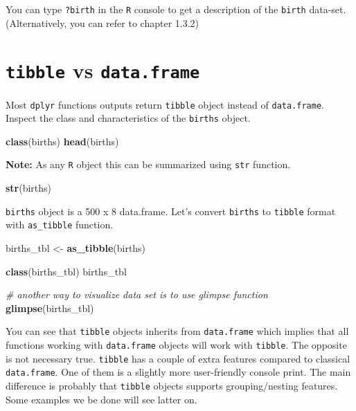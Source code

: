 \documentclass[
]{book}
\newenvironment{Shaded}{\begin{snugshade}}{\end{snugshade}}
\newcommand{\CommentTok}[1]{\textcolor[rgb]{0.56,0.35,0.01}{\textit{#1}}}
\newcommand{\FunctionTok}[1]{\textcolor[rgb]{0.13,0.29,0.53}{\textbf{#1}}}
\newcommand{\NormalTok}[1]{#1}
\newcommand{\OtherTok}[1]{\textcolor[rgb]{0.56,0.35,0.01}{#1}}
\begin{document}
You can type \texttt{?birth} in the \texttt{R} console to get a description of the \texttt{birth} data-set. (Alternatively, you can refer to chapter 1.3.2)

\section{\texorpdfstring{\texttt{tibble} vs \texttt{data.frame}}{tibble vs data.frame}}\label{tibble-vs-data.frame}

Most \texttt{dplyr} functions outputs return \texttt{tibble} object instead of
\texttt{data.frame}.
Inspect the class and characteristics of the \texttt{births} object.

\begin{Shaded}
\begin{Highlighting}[]
\FunctionTok{class}\NormalTok{(births)}
\FunctionTok{head}\NormalTok{(births)}
\end{Highlighting}
\end{Shaded}

\textbf{Note:} As any \texttt{R} object this can be summarized using \texttt{str} function.

\begin{Shaded}
\begin{Highlighting}[]
\FunctionTok{str}\NormalTok{(births)}
\end{Highlighting}
\end{Shaded}

\texttt{births} object is a 500 x 8 data.frame.
Let's convert \texttt{births} to \texttt{tibble} format with \texttt{as\_tibble} function.

\begin{Shaded}
\begin{Highlighting}[]
\NormalTok{births\_tbl }\OtherTok{\textless{}{-}} \FunctionTok{as\_tibble}\NormalTok{(births)}

\FunctionTok{class}\NormalTok{(births\_tbl)}
\NormalTok{births\_tbl}

\CommentTok{\# another way to visualize data set is to use glimpse function}
\FunctionTok{glimpse}\NormalTok{(births\_tbl)}
\end{Highlighting}
\end{Shaded}

You can see that \texttt{tibble} objects inherits from \texttt{data.frame} which implies that all functions
working with \texttt{data.frame} objects will work with \texttt{tibble}. The opposite is
not necessary true. \texttt{tibble} has a couple of extra features compared to classical
\texttt{data.frame}. One of them is a slightly more user-friendly console print. The main
difference is probably that \texttt{tibble} objects supports grouping/nesting features.
Some examples we be done will see latter on.
\end{document}
